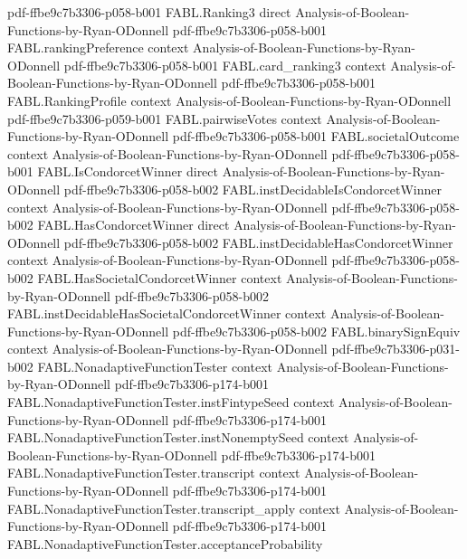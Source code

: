 \begin{theorem}
  {pdf-ffbe9c7b3306-p058-b001}
\proofstep
  {FABL.Ranking3}
  {direct}
  {Analysis-of-Boolean-Functions-by-Ryan-ODonnell}
  {pdf-ffbe9c7b3306-p058-b001}
\proofstep
  {FABL.rankingPreference}
  {context}
  {Analysis-of-Boolean-Functions-by-Ryan-ODonnell}
  {pdf-ffbe9c7b3306-p058-b001}
\proofstep
  {FABL.card_ranking3}
  {context}
  {Analysis-of-Boolean-Functions-by-Ryan-ODonnell}
  {pdf-ffbe9c7b3306-p058-b001}
\proofstep
  {FABL.RankingProfile}
  {context}
  {Analysis-of-Boolean-Functions-by-Ryan-ODonnell}
  {pdf-ffbe9c7b3306-p059-b001}
\proofstep
  {FABL.pairwiseVotes}
  {context}
  {Analysis-of-Boolean-Functions-by-Ryan-ODonnell}
  {pdf-ffbe9c7b3306-p058-b001}
\proofstep
  {FABL.societalOutcome}
  {context}
  {Analysis-of-Boolean-Functions-by-Ryan-ODonnell}
  {pdf-ffbe9c7b3306-p058-b001}
\proofstep
  {FABL.IsCondorcetWinner}
  {direct}
  {Analysis-of-Boolean-Functions-by-Ryan-ODonnell}
  {pdf-ffbe9c7b3306-p058-b002}
\proofstep
  {FABL.instDecidableIsCondorcetWinner}
  {context}
  {Analysis-of-Boolean-Functions-by-Ryan-ODonnell}
  {pdf-ffbe9c7b3306-p058-b002}
\proofstep
  {FABL.HasCondorcetWinner}
  {direct}
  {Analysis-of-Boolean-Functions-by-Ryan-ODonnell}
  {pdf-ffbe9c7b3306-p058-b002}
\proofstep
  {FABL.instDecidableHasCondorcetWinner}
  {context}
  {Analysis-of-Boolean-Functions-by-Ryan-ODonnell}
  {pdf-ffbe9c7b3306-p058-b002}
\proofstep
  {FABL.HasSocietalCondorcetWinner}
  {context}
  {Analysis-of-Boolean-Functions-by-Ryan-ODonnell}
  {pdf-ffbe9c7b3306-p058-b002}
\proofstep
  {FABL.instDecidableHasSocietalCondorcetWinner}
  {context}
  {Analysis-of-Boolean-Functions-by-Ryan-ODonnell}
  {pdf-ffbe9c7b3306-p058-b002}
\proofstep
  {FABL.binarySignEquiv}
  {context}
  {Analysis-of-Boolean-Functions-by-Ryan-ODonnell}
  {pdf-ffbe9c7b3306-p031-b002}
\proofstep
  {FABL.NonadaptiveFunctionTester}
  {context}
  {Analysis-of-Boolean-Functions-by-Ryan-ODonnell}
  {pdf-ffbe9c7b3306-p174-b001}
\proofstep
  {FABL.NonadaptiveFunctionTester.instFintypeSeed}
  {context}
  {Analysis-of-Boolean-Functions-by-Ryan-ODonnell}
  {pdf-ffbe9c7b3306-p174-b001}
\proofstep
  {FABL.NonadaptiveFunctionTester.instNonemptySeed}
  {context}
  {Analysis-of-Boolean-Functions-by-Ryan-ODonnell}
  {pdf-ffbe9c7b3306-p174-b001}
\proofstep
  {FABL.NonadaptiveFunctionTester.transcript}
  {context}
  {Analysis-of-Boolean-Functions-by-Ryan-ODonnell}
  {pdf-ffbe9c7b3306-p174-b001}
\proofstep
  {FABL.NonadaptiveFunctionTester.transcript_apply}
  {context}
  {Analysis-of-Boolean-Functions-by-Ryan-ODonnell}
  {pdf-ffbe9c7b3306-p174-b001}
\proofstep
  {FABL.NonadaptiveFunctionTester.acceptanceProbability}

\end{theorem}
